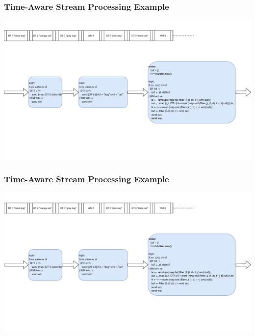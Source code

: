 \documentclass[aspectratio=169,10pt]{beamer}
\begin{document}
\begin{frame}
  \frametitle{Time-Aware Stream Processing Example}
    \includegraphics[page=20,width=.95\textwidth]{dataflow_ex1.pdf}
\end{frame}

\begin{frame}
  \frametitle{Time-Aware Stream Processing Example}
    \includegraphics[page=21,width=.95\textwidth]{dataflow_ex1.pdf}
\end{frame}
\end{document}
